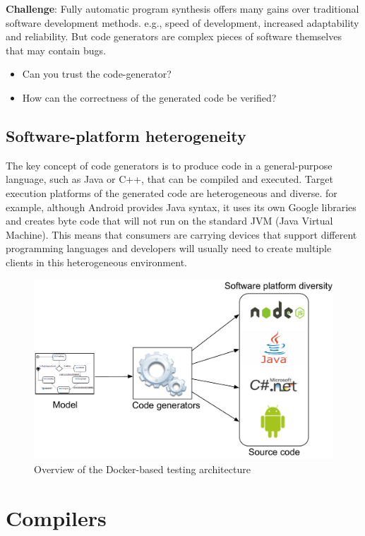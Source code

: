 \textbf{Challenge}: Fully automatic program synthesis offers many gains over traditional software development methods. e.g., speed of development, increased adaptability and reliability. But code generators are complex pieces of software themselves that may contain bugs.
\begin{itemize}
\item Can you trust the code-generator?
\item How can the correctness of the generated code be verified?
\end{itemize}
\subsection{Software-platform heterogeneity}
The key concept of code generators is to produce code in a general-purpose language, such as Java or C++, that can be compiled and executed. Target execution platforms of the generated code are heterogeneous and diverse.
for example, although Android provides Java syntax, it uses its own Google libraries and creates byte code that will not run on the standard JVM (Java Virtual Machine). This means that consumers are carrying devices that support different programming languages and developers will usually need to create multiple clients in this heterogeneous environment.
\begin{figure}[h]
	\center
	\includegraphics[scale=0.65]{Background/fig/software-diversity.pdf}
	\caption{Overview of the Docker-based testing architecture}
\end{figure}
\section{Compilers}
